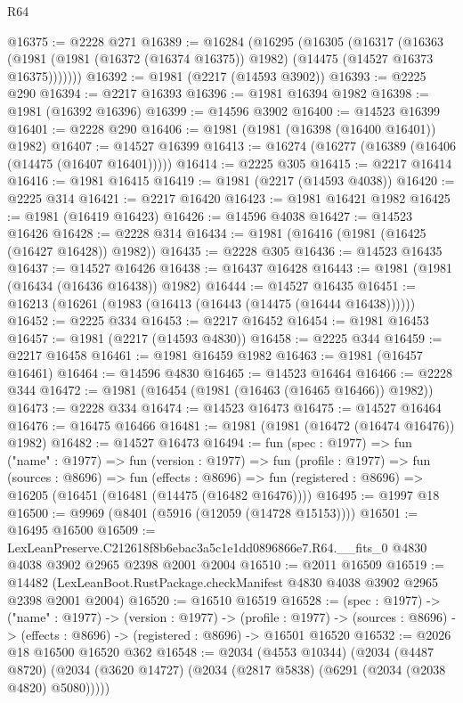 \begin{lexlean}{R64}
\begin{coremodule}
@16375 := @2228 @271
@16389 := @16284
    (@16295
      (@16305
        (@16317
          (@16363 (@1981 (@1981 (@16372 (@16374 @16375)) @1982) (@14475 (@14527 @16373 @16375)))))))
@16392 := @1981 (@2217 (@14593 @3902))
@16393 := @2225 @290
@16394 := @2217 @16393
@16396 := @1981 @16394 @1982
@16398 := @1981 (@16392 @16396)
@16399 := @14596 @3902
@16400 := @14523 @16399
@16401 := @2228 @290
@16406 := @1981 (@1981 (@16398 (@16400 @16401)) @1982)
@16407 := @14527 @16399
@16413 := @16274 (@16277 (@16389 (@16406 (@14475 (@16407 @16401)))))
@16414 := @2225 @305
@16415 := @2217 @16414
@16416 := @1981 @16415
@16419 := @1981 (@2217 (@14593 @4038))
@16420 := @2225 @314
@16421 := @2217 @16420
@16423 := @1981 @16421 @1982
@16425 := @1981 (@16419 @16423)
@16426 := @14596 @4038
@16427 := @14523 @16426
@16428 := @2228 @314
@16434 := @1981 (@16416 (@1981 (@16425 (@16427 @16428)) @1982))
@16435 := @2228 @305
@16436 := @14523 @16435
@16437 := @14527 @16426
@16438 := @16437 @16428
@16443 := @1981 (@1981 (@16434 (@16436 @16438)) @1982)
@16444 := @14527 @16435
@16451 := @16213 (@16261 (@1983 (@16413 (@16443 (@14475 (@16444 @16438))))))
@16452 := @2225 @334
@16453 := @2217 @16452
@16454 := @1981 @16453
@16457 := @1981 (@2217 (@14593 @4830))
@16458 := @2225 @344
@16459 := @2217 @16458
@16461 := @1981 @16459 @1982
@16463 := @1981 (@16457 @16461)
@16464 := @14596 @4830
@16465 := @14523 @16464
@16466 := @2228 @344
@16472 := @1981 (@16454 (@1981 (@16463 (@16465 @16466)) @1982))
@16473 := @2228 @334
@16474 := @14523 @16473
@16475 := @14527 @16464
@16476 := @16475 @16466
@16481 := @1981 (@1981 (@16472 (@16474 @16476)) @1982)
@16482 := @14527 @16473
@16494 := fun (spec : @1977) =>
  fun ("name" : @1977) =>
  fun (version : @1977) =>
  fun (profile : @1977) =>
  fun (sources : @8696) =>
  fun (effects : @8696) =>
  fun (registered : @8696) => @16205 (@16451 (@16481 (@14475 (@16482 @16476))))
@16495 := @1997 @18
@16500 := @9969 (@8401 (@5916 (@12059 (@14728 @15153))))
@16501 := @16495 @16500
@16509 := LexLeanPreserve.C212618f8b6ebac3a5c1e1dd0896866e7.R64.__fits_0
    @4830
    @4038
    @3902
    @2965
    @2398
    @2001
    @2004
@16510 := @2011 @16509
@16519 := @14482 (LexLeanBoot.RustPackage.checkManifest @4830 @4038 @3902 @2965 @2398 @2001 @2004)
@16520 := @16510 @16519
@16528 := (spec : @1977) ->
  ("name" : @1977) ->
  (version : @1977) ->
  (profile : @1977) ->
  (sources : @8696) -> (effects : @8696) -> (registered : @8696) -> @16501 @16520
@16532 := @2026 @18 @16500 @16520 @362
@16548 := @2034
    (@4553 @10344)
    (@2034
      (@4487 @8720)
      (@2034 (@3620 @14727) (@2034 (@2817 @5838) (@6291 (@2034 (@2038 @4820) @5080)))))

\end{coremodule}
\end{lexlean}
